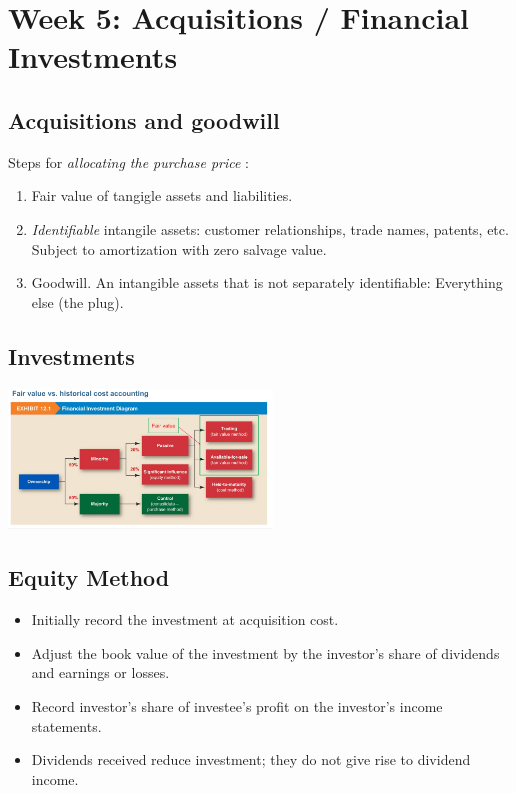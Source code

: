 \section*{Week 5: Acquisitions / Financial Investments}

\subsection*{Acquisitions and goodwill}


Steps for \textit{allocating the purchase price} :
\begin{enumerate}[noitemsep,topsep=0pt]
	\item Fair value of tangigle assets and liabilities.
	\item \textit{Identifiable} intangile assets: customer relationships, trade names, patents, etc. Subject to amortization with zero salvage value.
	\item Goodwill.  An intangible assets that is not separately identifiable: Everything else (the plug).
\end{enumerate}

\subsection*{Investments}

\includegraphics[width=7cm]{assets/fair_value_vs_historical_acct}

\subsection*{Equity Method}

\begin{itemize}[noitemsep,topsep=0pt]
	\item Initially record the investment at acquisition cost.
	\item Adjust the book value of the investment by the investor’s share of dividends and
	earnings or losses.
	\item Record investor’s share of investee’s profit on the investor’s income statements.
	\item Dividends received reduce investment; they do not give rise to dividend income.
\end{itemize}




